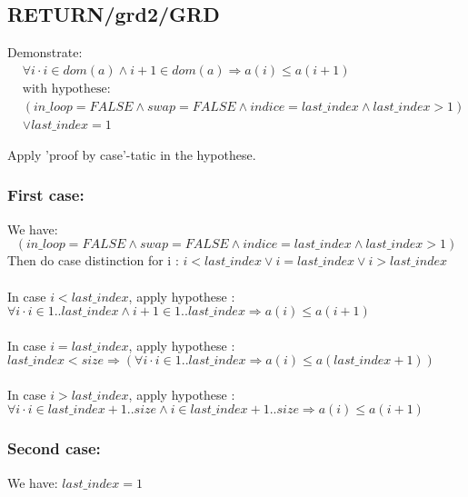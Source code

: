 \subsection{RETURN/grd2/GRD}
Demonstrate:
\begin{align*}
&\forall i \cdot i \in dom(a) \land i+1 \in dom(a) \Rightarrow a(i) \leq a(i+1) \\
&\text{with hypothese: } \\
&(in\_loop=FALSE \land swap=FALSE \land indice=last\_index \land last\_index>1) \\
&\lor last\_index=1
\end{align*}

Apply 'proof by case'-tatic in the hypothese.

\subsubsection{First case: }
We have:
$$
(in\_loop=FALSE \land swap=FALSE \land indice=last\_index \land last\_index>1)
$$
Then do case distinction for i : $i < last\_index \lor i = last\_index \lor i > last\_index$
\paragraph{}
In case $i < last\_index$, apply hypothese : \\
$
\forall i \cdot i \in 1..last\_index \land i+1 \in 1..last\_index \Rightarrow a(i) \leq a(i+1)
$

\paragraph{}
In case $i = last\_index$, apply hypothese :\\
$
last\_index < size \Rightarrow (\forall i \cdot i \in 1..last\_index \Rightarrow a(i) \leq a(last\_index+1))
$

\paragraph{}
In case $i > last\_index$, apply hypothese :\\
$
\forall i \cdot i \in last\_index+1..size \land i \in last\_index+1..size \Rightarrow a(i) \leq a(i+1)
$

\subsubsection{Second case:}
We have: $last\_index = 1$ \\
